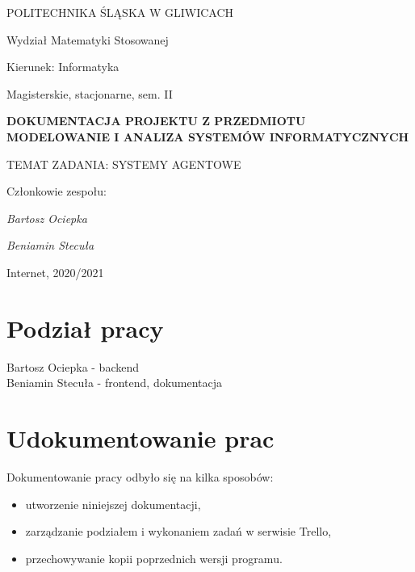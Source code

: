 \documentclass[12pt,a4paper]{article}
\begin{document}
\nocite{*}

\clearpage
\hspace{3cm}
\begin{center}POLITECHNIKA ŚLĄSKA W GLIWICACH\end{center}
\begin{center}Wydział Matematyki Stosowanej\end{center}
\begin{center}Kierunek: Informatyka\end{center}
\begin{center}Magisterskie, stacjonarne, sem. II\end{center}
\hspace{3cm}
\begin{center}\large\textbf{DOKUMENTACJA PROJEKTU Z PRZEDMIOTU\\MODELOWANIE I ANALIZA SYSTEMÓW INFORMATYCZNYCH}\end{center}
\hspace{10cm}
\begin{center}TEMAT ZADANIA: SYSTEMY AGENTOWE\end{center}
\hspace{5cm}
\begin{flushright}Członkowie zespołu:
\par
\textit{Bartosz Ociepka}
\par
\textit{Beniamin Stecuła}
\end{flushright}
\vfill
\begin{center}Internet, 2020/2021\end{center}

\newpage
\section{Podział pracy}

\begin{center}Bartosz Ociepka - backend\\Beniamin Stecuła - frontend, dokumentacja\end{center}



\section{Udokumentowanie prac}
	Dokumentowanie pracy odbyło się na kilka sposobów:
\begin{itemize}
	\item utworzenie niniejszej dokumentacji,
	\item zarządzanie podziałem i wykonaniem zadań w serwisie Trello,
	\item przechowywanie kopii poprzednich wersji programu.
\end{itemize}
\end{document}
